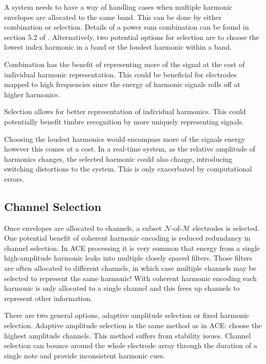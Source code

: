 \documentclass [11pt, proquest,oneside] {ganter_thesis}[2015/03/03]
\begin{document}
A system needs to have a way of handling cases when multiple harmonic envelopes are allocated to the same band.  This can be done by either combination or selection.  Details of a power sum combination can be found in section 5.2 of \cite{laneau2005deaf}.  Alternatively, two potential options for selection are to choose the lowest index harmonic in a band or the loudest harmonic within a band.

Combination has the benefit of representing more of the signal at the cost of individual harmonic representation. This could be beneficial for electrodes mapped to high frequencies since the energy of harmonic signals rolls off at higher harmonics.

Selection allows for better representation of individual harmonics.  This could potentially benefit timbre recognition by more uniquely representing signals.

Choosing the loudest harmonics would encompass more of the signals energy however this comes at a cost.  In a real-time system, as the relative amplitude of harmonics changes, the selected harmonic could also change, introducing switching distortions to the system.  This is only exacerbated by computational errors.


\subsection{Channel Selection}

Once envelopes are allocated to channels, a subset $\mathcal{N}$-of-$\mathcal{M}$ electrodes is selected.  One potential benefit of coherent harmonic encoding is reduced redundancy in channel selection.  In ACE processing it is very common that energy from a single high-amplitude harmonic leaks into multiple closely spaced filters.  Those filters are often allocated to different channels, in which case multiple channels may be selected to represent the same harmonic!  With coherent harmonic encoding each harmonic is only allocated to a single channel and this frees up channels to represent other information.

There are two general options, adaptive amplitude selection or fixed harmonic selection.  Adaptive amplitude selection is the same method as in ACE: choose the highest amplitude channels.  This method suffers from stability issues.  Channel selection can bounce around the whole electrode array through the duration of a single note and provide inconsistent harmonic cues.
\end{document}

